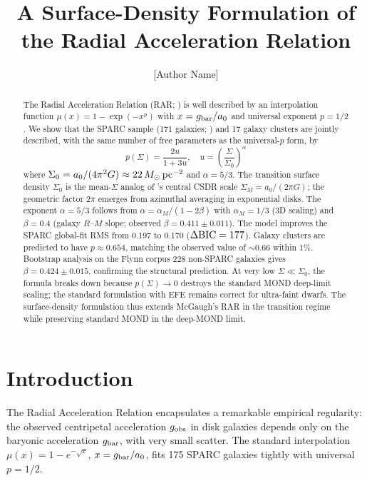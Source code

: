 \documentclass[twocolumn]{aastex631}
\begin{document}
\title{A Surface-Density Formulation of the Radial Acceleration Relation}

\author{[Author Name]}
\email{[email]}

\begin{abstract}
The Radial Acceleration Relation (RAR; \citealt{McGaugh2016})
is well described by an interpolation function $\mu(x) = 1 - \exp(-x^p)$
with $x = g_{\rm bar}/a_0$ and universal exponent $p = 1/2$.
We show that the SPARC sample (171 galaxies; \citealt{Lelli2016})
and 17 galaxy clusters are jointly described, with the same number
of free parameters as the universal-$p$ form, by
\begin{equation}
p(\Sigma) = \frac{2u}{1+3u}, \quad u = \left(\frac{\Sigma}{\Sigma_0}\right)^\alpha
\end{equation}
where $\Sigma_0 = a_0/(4\pi^2 G) \approx 22\,M_\odot\,{\rm pc}^{-2}$ and
$\alpha = 5/3$. The transition surface density $\Sigma_0$ is the
mean-$\Sigma$ analog of \citet{Milgrom2016}'s central CSDR scale
$\Sigma_M = a_0/(2\pi G)$; the geometric factor $2\pi$ emerges from
azimuthal averaging in exponential disks. The exponent $\alpha = 5/3$
follows from $\alpha = \alpha_M/(1-2\beta)$ with $\alpha_M = 1/3$
(3D scaling) and $\beta = 0.4$ (galaxy $R$--$M$ slope; observed
$\beta = 0.411 \pm 0.011$). The model improves the SPARC global-fit
RMS from 0.197 to 0.170 ($\Delta{\rm BIC} = 177$). Galaxy clusters
are predicted to have $p \approx 0.654$, matching the observed value
of $\sim 0.66$ within 1\%. Bootstrap analysis on the Flynn corpus
228 non-SPARC galaxies gives $\beta = 0.424 \pm 0.015$, confirming
the structural prediction. At very low $\Sigma \ll \Sigma_0$, the
formula breaks down because $p(\Sigma) \to 0$ destroys the standard
MOND deep-limit scaling; the standard \citet{McGaugh2016Crater}
formulation with EFE remains correct for ultra-faint dwarfs. The
surface-density formulation thus extends McGaugh's RAR in the
transition regime while preserving standard MOND in the deep-MOND
limit.
\end{abstract}


\section{Introduction} \label{sec:intro}

The Radial Acceleration Relation \citep{McGaugh2016} encapsulates a
remarkable empirical regularity: the observed centripetal acceleration
$g_{\rm obs}$ in disk galaxies depends only on the baryonic acceleration
$g_{\rm bar}$, with very small scatter. The standard interpolation
$\mu(x) = 1 - e^{-\sqrt{x}}$, $x = g_{\rm bar}/a_0$, fits 175 SPARC
galaxies tightly with universal $p = 1/2$.
\end{document}
